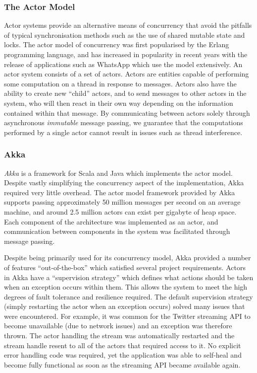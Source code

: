 \documentclass{l4proj}
\begin{document}
    \subsubsection{The Actor Model}

Actor systems provide an alternative means of concurrency that avoid the pitfalls of typical synchronisation methods such as the use of shared mutable state and locks. The actor model of concurrency was first popularised by the Erlang programming language, and has increased in popularity in recent years with the release of applications such as WhatsApp which use the model extensively. An actor system consists of a set of actors. Actors are entities capable of performing some computation on a thread in response to messages. Actors also have the ability to create new “child” actors, and to send messages to other actors in the system, who will then react in their own way depending on the information contained within that message. By communicating between actors solely through asynchronous \textit{immutable} message passing, we guarantee that the computations performed by a single actor cannot result in issues such as thread interference.

\subsubsection{Akka}

    \textit{Akka} is a framework for Scala and Java which implements the actor model. Despite vastly simplifying the concurrency aspect of the implementation, Akka required very little overhead. The actor model framework provided by Akka supports passing approximately 50 million messages per second on an average machine, and around 2.5 million actors can exist per gigabyte of heap space. Each component of the architecture was implemented as an actor, and communication between components in the system was facilitated through message passing.
            
        
        Despite being primarily used for its concurrency model, Akka provided a number of features ``out-of-the-box'' which satisfied several project requirements. Actors in Akka have a ``supervision strategy'' which defines what actions should be taken when an exception occurs within them. This allows the system to meet the high degrees of fault tolerance and resilience required. The default supervision strategy (simply restarting the actor when an exception occurs) solved many issues that were encountered. For example, it was common for the Twitter streaming API to become unavailable (due to network issues) and an exception was therefore thrown. The actor handling the stream was automatically restarted and the stream handle resent to all of the actors that required access to it. No explicit error handling code was required, yet the application was able to self-heal and become fully functional as soon as the streaming API became available again.
\end{document}
